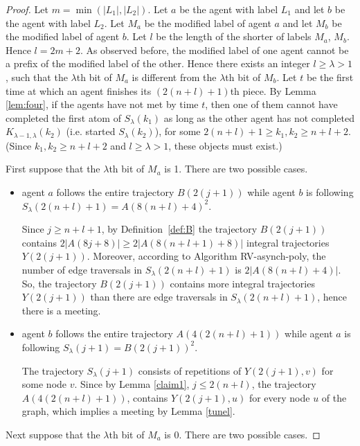 \documentclass [11pt] {article}
\begin{document}
\begin{proof}
Let $m=\min(|L_1|,|L_2|)$. Let $a$ be the agent with label $L_1$ and let $b$ be the agent with label $L_2$.
Let $M_a$ be the modified label of agent $a$ and let $M_b$ be the modified label of agent $b$. Let $l$ be the length of the shorter of labels $M_a$,  $M_b$.
Hence $l=2m+2$.
As observed before, the modified label of one agent cannot be a prefix of the modified label of the other. Hence there exists an integer {$l \geq \lambda > 1$}, such that 
the $\lambda$th bit of $M_a$ is different from the $\lambda$th bit of $M_b$.
{Let $t$ be the first time at which an agent finishes its $(2(n+l)+1)$th piece.
By Lemma \ref{lem:four},  if the agents have not met by time $t$,} then one of them cannot have completed the first atom of  $S_\lambda(k_1)$ as long as the other agent has not completed $K_{\lambda-1,\lambda}(k_2)$ {(i.e. started $S_\lambda(k_2)$)}, {for some $2(n+l)+1\ge k_1,k_2 \ge n+l+2$. (Since $k_1,k_2 \ge n+l+2$ and $l \geq \lambda > 1$, these objects must exist.)}


First suppose that the $\lambda$th bit of $M_a$ is 1. There are two possible cases.

\begin{itemize}
\item agent $a$ follows the entire trajectory $B(2(j+1))$ while agent $b$ is following $S_{\lambda}(2(n+l)+1)=A(8(n+l)+4)^2$. 


Since $j\ge n+l+1$, by Definition~\ref{def:B} the trajectory $B(2(j+1))$ contains $2|A(8j+8)|\ge 2|A(8(n+l+1)+8)|$ 
integral trajectories $Y(2(j+1))$. Moreover, according to Algorithm RV-asynch-poly, the number of {edge traversals} in $S_{\lambda}(2(n+l)+1)$ is $2|A(8(n+l)+4)|$. So, the trajectory $B(2(j+1))$ contains more integral trajectories $Y(2(j+1))$ than there are {edge traversals} in $S_{\lambda}(2(n+l)+1)$, hence there is a meeting.

\item agent $b$ follows the entire trajectory $A(4(2(n+l)+1))$ while agent $a$ is following  $S_{\lambda}(j+1)= B(2(j+1))^2$. 

The trajectory $S_{\lambda}(j+1)$ consists of repetitions of $Y(2(j+1),v)$ for some node $v$. 
Since by Lemma \ref{claim1}, $j\le 2(n+l)$, the trajectory $A(4(2(n+l)+1))$, contains $Y(2(j+1),u)$ for every node $u$ of the graph, which implies a meeting by Lemma \ref{tunel}.
\end{itemize}

Next suppose that the $\lambda$th bit of $M_a$ is 0. There are two possible cases.


\end{proof}
\end{document}
